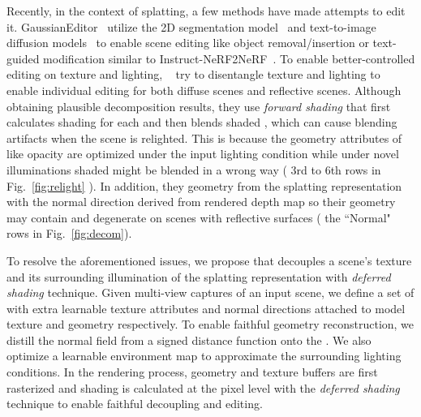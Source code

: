 Recently, in the context of  splatting, a few methods have made attempts to edit it. 
GaussianEditor~\cite{GaussianEditor,GaussianEditor_text} utilize the 2D segmentation model~\cite{SAM} and text-to-image diffusion models~\cite{Diffusion} to enable scene editing like object removal/insertion or text-guided modification similar to Instruct-NeRF2NeRF~\cite{Instruct-NeRF2NeRF}. 
To enable better-controlled editing on texture and lighting, ~\cite{RelightableGaussian, GS-IR, GaussianShader, GIR} try to disentangle texture and lighting to enable individual editing for both diffuse scenes and reflective scenes. 
Although obtaining plausible decomposition results, they use \textit{forward shading} that first calculates shading for each  and then blends shaded , which can cause blending artifacts when %
the scene is relighted.
This is because the geometry attributes of  like opacity are optimized under the input lighting condition while under novel illuminations shaded  might be blended in a wrong way ( 3rd to 6th 
 rows in Fig.~\ref{fig:relight} ). 
In addition, they  geometry from the  splatting representation with the normal direction derived from  rendered depth map so their geometry may contain  and degenerate on scenes with reflective surfaces ( the ``Normal" rows in Fig.~\ref{fig:decom}). 

To resolve the aforementioned issues, we propose \name that decouples a scene's texture and its surrounding illumination of the  splatting representation with  \textit{deferred shading} technique. 
Given multi-view captures of an input scene, we define a set of  with extra learnable texture attributes and normal directions attached to model texture and geometry respectively. 
To enable faithful geometry reconstruction, we distill the normal field from a signed distance function  onto the . 
We also optimize a learnable environment map to approximate the surrounding lighting conditions. 
In the rendering process, geometry and texture buffers are first rasterized and shading is calculated at the pixel level with the \textit{deferred shading} technique to enable faithful decoupling and editing. 

